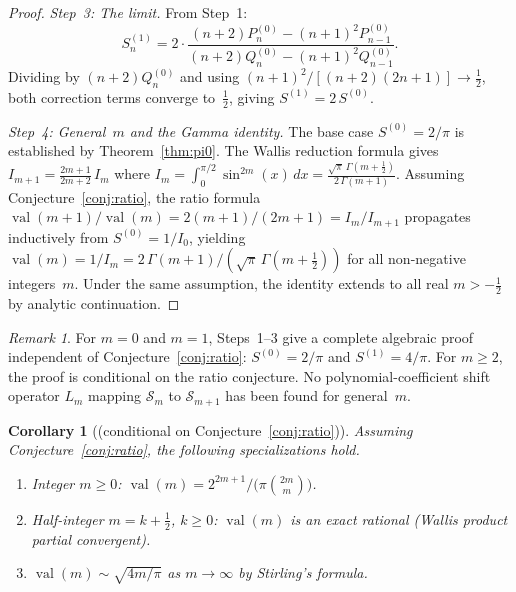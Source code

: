 \documentclass[11pt,a4paper]{article}
\theoremstyle{plain}
\newtheorem{corollary}[theorem]{Corollary}
\theoremstyle{definition}
\theoremstyle{remark}
\newtheorem{remark}[theorem]{Remark}
\newcommand{\half}{\tfrac{1}{2}}
\begin{document}
\begin{proof}
\medskip
\emph{Step~3: The limit.}
From Step~1:
\[
  S_n^{(1)}
  = 2\cdot\frac{(n{+}2)P_n^{(0)} - (n{+}1)^2 P_{n-1}^{(0)}}
              {(n{+}2)Q_n^{(0)} - (n{+}1)^2 Q_{n-1}^{(0)}}.
\]
Dividing by $(n{+}2)Q_n^{(0)}$ and using
$(n{+}1)^2/[(n{+}2)(2n{+}1)] \to \frac{1}{2}$,
both correction terms converge to~$\frac{1}{2}$, giving
$S^{(1)} = 2\,S^{(0)}$.

\medskip
\emph{Step~4: General~$m$ and the Gamma identity.}
The base case $S^{(0)} = 2/\pi$ is established by
Theorem~\ref{thm:pi0}.
The Wallis reduction formula gives
$I_{m+1} = \frac{2m{+}1}{2m{+}2}\,I_m$
where $I_m = \int_0^{\pi/2}\sin^{2m}(x)\,dx
= \frac{\sqrt{\pi}\,\Gamma(m{+}\frac{1}{2})}{2\,\Gamma(m{+}1)}$.
Assuming Conjecture~\ref{conj:ratio},
the ratio formula
$\operatorname{val}(m{+}1)/\operatorname{val}(m)
= 2(m{+}1)/(2m{+}1) = I_m/I_{m+1}$
propagates inductively from $S^{(0)} = 1/I_0$,
yielding $\operatorname{val}(m) = 1/I_m =
2\,\Gamma(m{+}1)/(\sqrt{\pi}\,\Gamma(m{+}\half))$
for all non-negative integers~$m$.
Under the same assumption, the identity extends to all real
$m > -\frac{1}{2}$ by analytic continuation.
\end{proof}

\begin{remark}
For $m = 0$ and $m = 1$, Steps~1--3 give a complete algebraic proof
independent of Conjecture~\ref{conj:ratio}:
$S^{(0)} = 2/\pi$ and $S^{(1)} = 4/\pi$.
For $m \ge 2$, the proof is conditional on the ratio conjecture.
No polynomial-coefficient shift operator $L_m$ mapping $\mathcal{S}_m$
to $\mathcal{S}_{m+1}$ has been found for general~$m$.
\end{remark}

\begin{corollary}[{\normalfont(conditional on Conjecture~\ref{conj:ratio})}]\label{cor:special}
Assuming Conjecture~\ref{conj:ratio}, the following specializations hold.
\begin{enumerate}
\item[\textup{(i)}]
  Integer $m \ge 0$:
  $\operatorname{val}(m) = 2^{2m+1}/\bigl(\pi\binom{2m}{m}\bigr)$.
\item[\textup{(ii)}]
  Half-integer $m = k{+}\half$, $k \ge 0$:
  $\operatorname{val}(m)$ is an exact rational (Wallis product partial convergent).
\item[\textup{(iii)}]
  $\operatorname{val}(m) \sim \sqrt{4m/\pi}$
  as $m \to \infty$ by Stirling's formula.
\end{enumerate}
\end{corollary}
\end{document}
